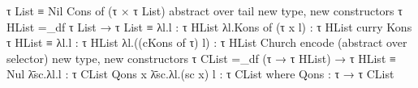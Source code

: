 \documentclass[screen,anonymous,review,draft,natbib=false]{acmart} %
\begin{document}
 τ List                                                                  ≡                                        Nil                                              Cons of (τ × τ List)                            
                                                                         abstract over tail                                                                        new type, new constructors                      
 τ HList =_df τ List → τ List                                            ≡                                        λl.l : τ HList                                   λl.Kons of (τ x l) : τ HList                    
                                                                         curry Kons                                                                                                                                
 τ HList                                                                 ≡                                        λl.l : τ HList                                   λl.((cKons of τ) l) : τ HList                   
                                                                         Church encode (abstract over selector)                                                    new type, new constructors                      
 τ CList =_df (τ → τ HList) → τ HList                                    ≡                                        Nul \= λsc.λl.l : τ CList                        Qons x \= λsc.λl.(sc x) l : τ CList             
                                                                                                                                                                   where Qons : τ → τ CList                        
                                                                                                                                                                                                                   
\end{document}
